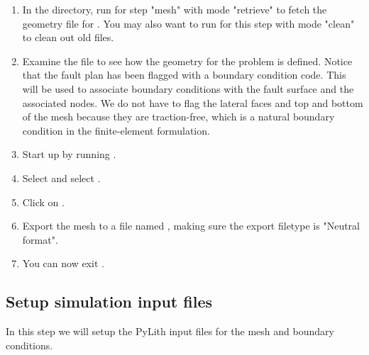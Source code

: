 \begin{enumerate}
\item In the  directory, run
   for step "mesh" with mode "retrieve" to fetch the
  geometry file for . You may also want to run
   for this step with mode "clean" to clean out old
  files.

  \begin{screen}
    \shellprompt{}
    \shellprompt{}
  \end{screen}
  
\item Examine the  file to see how the geometry
  for the problem is defined. Notice that the fault plan has
  been flagged with a boundary condition code. This will be
  used to associate boundary conditions with the fault surface and the
  associated nodes. We do not have to flag the lateral faces and top
  and bottom of the mesh because they are traction-free, which is a
  natural boundary condition in the finite-element formulation.
\item Start up  by running .

  \begin{screen}
    \shellprompt{}
  \end{screen}
  
\item Select \guiselect{}
  and select .
\item Click on .
\item Export the mesh to a file named ,
  making sure the export filetype is "Neutral format".
\item You can now exit .
\end{enumerate}

\subsection{Setup simulation input files}

In this step we will setup the PyLith input files for the mesh and
boundary conditions.

